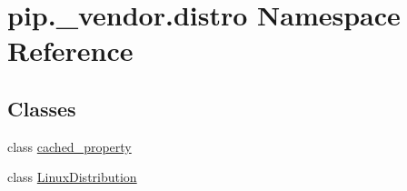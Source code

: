 \hypertarget{namespacepip_1_1__vendor_1_1distro}{}\section{pip.\+\_\+vendor.\+distro Namespace Reference}
\label{namespacepip_1_1__vendor_1_1distro}
\subsection*{Classes}
\begin{DoxyCompactItemize}
\item 
class \hyperlink{classpip_1_1__vendor_1_1distro_1_1cached__property}{cached\+\_\+property}
\item 
class \hyperlink{classpip_1_1__vendor_1_1distro_1_1LinuxDistribution}{Linux\+Distribution}
\end{DoxyCompactItemize}
